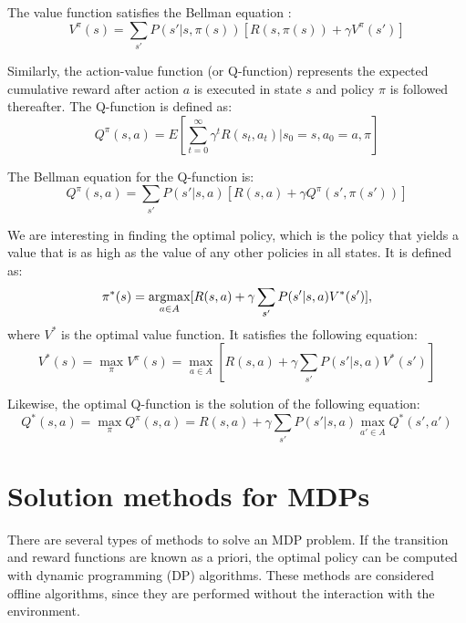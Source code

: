The value function satisfies the Bellman equation \cite{Bellman57}:
\begin{equation}
    V^{\pi}(s) = \sum_{s'}P(s'|s, \pi(s))[R(s, \pi(s)) + \gamma V^{\pi}(s')]
    \label{eq:V}
\end{equation}

Similarly, the action-value function (or Q-function) represents the expected
cumulative reward after action $a$ is executed in state $s$ and policy $\pi$ is
followed thereafter.
The Q-function is defined as:
\begin{equation}
    Q^{\pi}(s, a) = E[\sum_{t=0}^{\infty}\gamma^t R(s_t, a_t) | s_0=s, a_0 = a, \pi]
\end{equation}

The Bellman equation for the Q-function is:
\begin{equation}
    Q^{\pi}(s, a) = \sum_{s'}P(s'|s, a)[R(s, a) + \gamma Q^{\pi}(s', \pi(s'))]
    \label{eq:Q}
\end{equation}

We are interesting in finding the optimal policy, which is the policy 
that yields a value that is as high as the value of any other policies in all states.
It is defined as:
\begin{equation}
    \pi^*(s) = \argmax_{a \in A} [R(s, a) + \gamma \sum_{s'} P(s'|s, a)V^*(s')],
\end{equation}
where $V^*$ is the optimal value function. It satisfies the following equation:
\begin{equation}
    V^*(s) = \max_{\pi} V^{\pi} (s) = \max_{a \in A} [R(s, a) + \gamma \sum_{s'} P(s'|s, a)V^*(s')]
\end{equation}

Likewise, the optimal Q-function is the solution of the following equation:
\begin{equation}
    Q^*(s, a) = \max_{\pi} Q^{\pi}(s, a) = R(s, a) + \gamma \sum_{s'} P(s'|s, a) \max_{a' \in A} Q^*(s', a')
    \label{eq:optimalQ}
\end{equation}

\section{Solution methods for MDPs}

There are several types of methods to solve an MDP problem. If the transition and reward functions are known as a priori, 
the optimal policy can be computed with dynamic programming (DP) algorithms.
These methods are considered offline algorithms, since they are performed without
the interaction with the environment.

